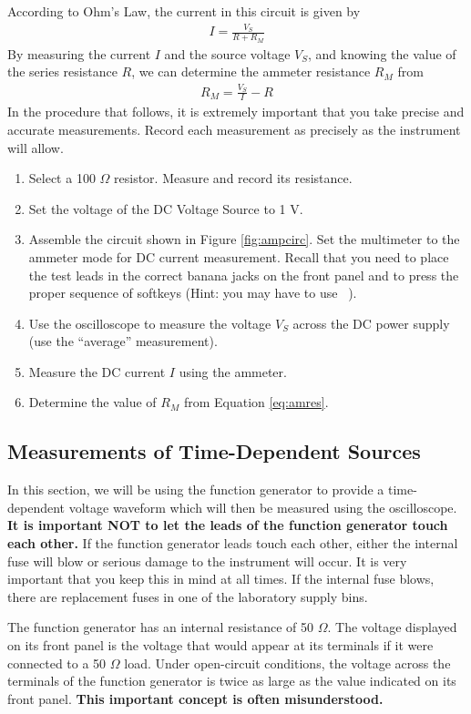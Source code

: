 \documentclass[12pt]{../manual}
\begin{document}
According to Ohm's Law, the current in this circuit is given by
\begin{align}
I = \frac{V_S}{R + R_M}
\end{align}
By measuring the current $I$ and the source voltage $V_S$, and knowing the value of the series resistance $R$, we can determine the ammeter resistance $R_M$ from
\begin{align}
R_M = \frac{V_S}{I} - R \label{eq:amres}
\end{align}
In the procedure that follows, it is extremely important that you take precise and accurate measurements. Record each measurement as precisely as the instrument will allow.
\begin{enumerate}
\item Select a 100 $\Omega$ resistor. Measure and record its resistance. 
\item Set the voltage of the DC Voltage Source to 1 V.
\item Assemble the circuit shown in Figure \ref{fig:ampcirc}. Set the multimeter to the ammeter mode for DC current measurement. Recall that you need to place the test leads in the correct banana jacks on the front panel and to press the proper sequence of softkeys (Hint: you may have to use ~). 
\item Use the oscilloscope to measure the voltage $V_S$ across the DC power supply (use the ``average'' measurement).
\item Measure the DC current $I$ using the ammeter. 
\item Determine the value of $R_M$ from Equation \eqref{eq:amres}. 
\end{enumerate}

\subsection{Measurements of Time-Dependent Sources}
In this section, we will be using the function generator to provide a time-dependent voltage waveform which will then be measured using the oscilloscope. \textbf{It is important NOT to let the leads of the function generator touch each other.} If the function generator leads touch each other, either the internal fuse will blow or serious damage to the instrument will occur. It is very important that you keep this in mind at all times. If the internal fuse blows, there are replacement fuses in one of the laboratory supply bins.

The function generator has an internal resistance of 50 $\Omega$. The voltage displayed on its front panel is the voltage that would appear at its terminals if it were connected to a 50 $\Omega$ load. Under open-circuit conditions, the voltage across the terminals of the function generator is twice as large as the value indicated on its front panel. \textbf{This important concept is often misunderstood.}
\end{document}
